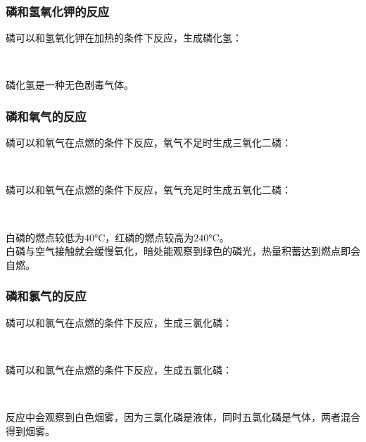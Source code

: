 \documentclass[UTF8]{ctexart}
\begin{document}
\subsubsection{磷和氢氧化钾的反应}
    磷可以和氢氧化钾在加热的条件下反应，生成磷化氢：
    \begin{center}
        \\[7mm]
    \end{center}
    磷化氢是一种无色剧毒气体。

\subsubsection{磷和氧气的反应}
    磷可以和氧气在点燃的条件下反应，氧气不足时生成三氧化二磷：
    \begin{center}
        \\[7mm]
    \end{center}
    磷可以和氧气在点燃的条件下反应，氧气充足时生成五氧化二磷：
    \begin{center}
        \\[7mm]
    \end{center}
    白磷的燃点较低为$40$\si{\degreeCelsius}，红磷的燃点较高为$240$\si{\degreeCelsius}。\\[3mm]
    白磷与空气接触就会缓慢氧化，暗处能观察到绿色的磷光，热量积蓄达到燃点即会自燃。

\subsubsection{磷和氯气的反应}
    磷可以和氯气在点燃的条件下反应，生成三氯化磷：
    \begin{center}
        \\[7mm]
    \end{center}
    磷可以和氯气在点燃的条件下反应，生成五氯化磷：
    \begin{center}
        \\[7mm]
    \end{center}
    反应中会观察到白色烟雾，因为三氯化磷是液体，同时五氯化磷是气体，两者混合得到烟雾。

\newpage
\end{document}

